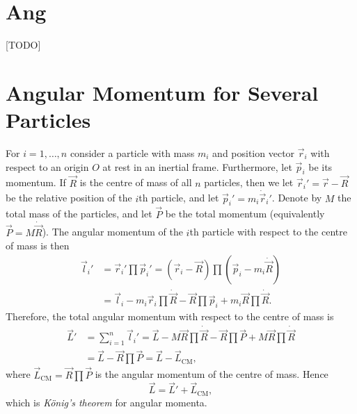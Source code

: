 \documentclass[article, a4paper, 11pt, oneside]{memoir}
\numberwithin{equation}{chapter}
\begin{document}
\section{Ang}

[TODO]

\section{Angular Momentum for Several Particles}

\newcommand{\CM}{\mathrm{CM}}

\begin{remarkbreak}
    For $i = 1, \ldots, n$ consider a particle with mass $m_i$ and position vector $\vec{r}_i$ with respect to an origin $O$ at rest in an inertial frame. Furthermore, let $\vec{p}_i$ be its momentum. If $\vec{R}$ is the centre of mass of all $n$ particles, then we let $\vec{r}_i' = \vec{r} - \vec{R}$ be the relative position of the $i$th particle, and let $\vec{p}_i' = m_i \dot{\vec{r}}_i'$. Denote by $M$ the total mass of the particles, and let $\vec{P}$ be the total momentum (equivalently $\vec{P} = M \dot{\vec{R}}$). The angular momentum of the $i$th particle with respect to the centre of mass is then
    \begin{align*}
        \vec{l}_i'
            &= \vec{r}_i' \prod \vec{p}_i'
             = (\vec{r}_i - \vec{R}) \prod (\vec{p}_i - m_i \dot{\vec{R}}) \\
            &= \vec{l}_i - m_i \vec{r}_i \prod \dot{\vec{R}} - \vec{R} \prod \vec{p}_i + m_i \vec{R} \prod \dot{\vec{R}}.
    \end{align*}
    Therefore, the total angular momentum with respect to the centre of mass is
    \begin{align*}
        \vec{L}'
            &= \sum_{i=1}^n \vec{l}_i'
             = \vec{L} - M \vec{R} \prod \dot{\vec{R}} - \vec{R} \prod \vec{P} + M \vec{R} \prod \dot{\vec{R}} \\
            &= \vec{L} - \vec{R} \prod \vec{P}
             = \vec{L} - \vec{L}_\CM,
    \end{align*}
    where $\vec{L}_\CM = \vec{R} \prod \vec{P}$ is the angular momentum of the centre of mass. Hence
    \begin{equation*}
        \vec{L} = \vec{L}' + \vec{L}_\CM,
    \end{equation*}
    which is \emph{König's theorem} for angular momenta.
\end{remarkbreak}
\end{document}
